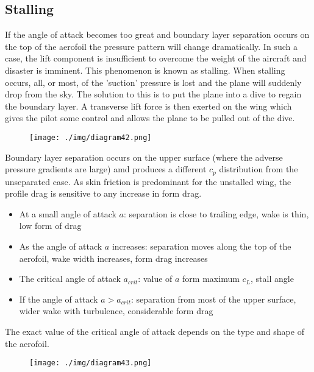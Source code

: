 \subsection{Stalling}
If the angle of attack becomes too great and boundary layer separation occurs on the top of the aerofoil the pressure pattern will change dramatically. In such a case, the lift component is insufficient to overcome the weight of the aircraft and disaster is imminent. This phenomenon is known as stalling. When stalling occurs, all, or most, of the 'suction' pressure is lost and the plane will suddenly drop from the sky. The solution to this is to put the plane into a dive to regain the boundary layer. A transverse lift force is then exerted on the wing which gives the pilot some control and allows the plane to be pulled out of the dive.
\begin{figure}[H]
  \centering
  \texttt{[image: ./img/diagram42.png]}
\end{figure}
Boundary layer separation occurs on the upper surface (where the adverse pressure gradients are large) amd produces a different $c_p$ distribution from the unseparated case. As skin friction is predominant for the unstalled wing, the profile drag is sensitive to any increase in form drag.
\begin{itemize}
  \item At a small angle of attack $a$: separation is close to trailing edge, wake is thin, low form of drag
  \item As the angle of attack $a$ increases: separation moves along the top of the aerofoil, wake width increases, form drag increases
  \item The critical angle of attack $a_{crit}$: value of $a$ form maximum $c_L$, stall angle
  \item If the angle of attack $a > a_{crit}$: separation from most of the upper surface, wider wake with turbulence, considerable form drag
\end{itemize}
The exact value of the critical angle of attack depends on the type and shape of the aerofoil.
\begin{figure}[H]
  \centering
  \texttt{[image: ./img/diagram43.png]}
\end{figure}
